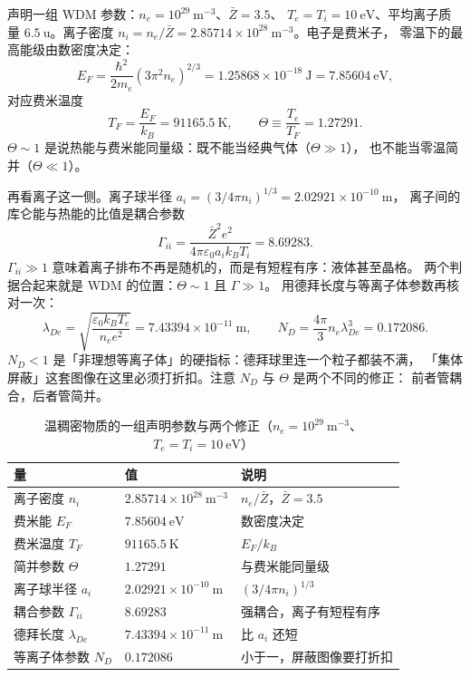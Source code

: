 声明一组 WDM 参数：$n_e=10^{29}\ \mathrm{m^{-3}}$、$\bar Z=3.5$、
$T_e=T_i=10\ \mathrm{eV}$、平均离子质量 $6.5\ \mathrm{u}$。离子密度
$n_i=n_e/\bar Z=2.85714\times10^{28}\ \mathrm{m^{-3}}$。电子是费米子，
零温下的最高能级由数密度决定：
\begin{equation}
E_F=\frac{\hbar^2}{2m_e}\left(3\pi^2 n_e\right)^{2/3}
=1.25868\times10^{-18}\ \mathrm{J}=7.85604\ \mathrm{eV},
\label{eq:app-aw-ef}
\end{equation}
对应费米温度
\begin{equation}
T_F=\frac{E_F}{k_B}=91165.5\ \mathrm{K},\qquad
\Theta\equiv\frac{T_e}{T_F}=1.27291.
\label{eq:app-aw-tf}
\end{equation}
$\Theta\sim1$ 是说热能与费米能同量级：既不能当经典气体（$\Theta\gg1$），
也不能当零温简并（$\Theta\ll1$）。

再看离子这一侧。离子球半径 $a_i=(3/4\pi n_i)^{1/3}=2.02921\times10^{-10}\ \mathrm{m}$，
离子间的库仑能与热能的比值是耦合参数
\begin{equation}
\Gamma_{ii}=\frac{\bar Z^2e^2}{4\pi\varepsilon_0 a_i k_BT_i}=8.69283.
\label{eq:app-aw-gamma}
\end{equation}
$\Gamma_{ii}\gg1$ 意味着离子排布不再是随机的，而是有短程有序：液体甚至晶格。
两个判据合起来就是 WDM 的位置：$\Theta\sim1$ 且 $\Gamma\gg1$。
用德拜长度与等离子体参数再核对一次：
\begin{equation}
\lambda_{De}=\sqrt{\frac{\varepsilon_0k_BT_e}{n_ee^2}}=7.43394\times10^{-11}\ \mathrm{m},
\qquad
N_D=\frac{4\pi}{3}n_e\lambda_{De}^3=0.172086.
\label{eq:app-aw-theta}
\end{equation}
$N_D<1$ 是「非理想等离子体」的硬指标：德拜球里连一个粒子都装不满，
「集体屏蔽」这套图像在这里必须打折扣。注意 $N_D$ 与 $\Theta$ 是两个不同的修正：
前者管耦合，后者管简并。

\begin{table}[htbp]
\centering
\small
\caption{温稠密物质的一组声明参数与两个修正（$n_e=10^{29}\ \mathrm{m^{-3}}$、$T_e=T_i=10\ \mathrm{eV}$）}
\label{tab:app-aw-wdm}
\begin{tabular}{p{4.2cm}p{4.2cm}p{4.4cm}}
\hline
量 & 值 & 说明 \\
\hline
离子密度 $n_i$ & $2.85714\times10^{28}\ \mathrm{m^{-3}}$ & $n_e/\bar Z$，$\bar Z=3.5$ \\
费米能 $E_F$ & $7.85604\ \mathrm{eV}$ & 数密度决定 \\
费米温度 $T_F$ & $91165.5\ \mathrm{K}$ & $E_F/k_B$ \\
简并参数 $\Theta$ & $1.27291$ & 与费米能同量级 \\
离子球半径 $a_i$ & $2.02921\times10^{-10}\ \mathrm{m}$ & $(3/4\pi n_i)^{1/3}$ \\
耦合参数 $\Gamma_{ii}$ & $8.69283$ & 强耦合，离子有短程有序 \\
德拜长度 $\lambda_{De}$ & $7.43394\times10^{-11}\ \mathrm{m}$ & 比 $a_i$ 还短 \\
等离子体参数 $N_D$ & $0.172086$ & 小于一，屏蔽图像要打折扣 \\
\hline
\end{tabular}
\end{table}


